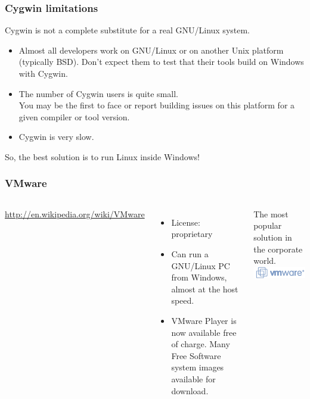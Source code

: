 \begin{frame}
  \frametitle{Cygwin limitations}
  Cygwin is not a complete substitute for a real GNU/Linux system.
  \begin{itemize}
  \item Almost all developers work on GNU/Linux or on another Unix
    platform (typically BSD). Don't expect them to test that their
    tools build on Windows with Cygwin.
  \item The number of Cygwin users is quite small.\\
    You may be the first to face or report building issues on this
    platform for a given compiler or tool version.
  \item Cygwin is very slow.
  \end{itemize}
  So, the best solution is to run Linux inside Windows!
\end{frame}

\begin{frame}
  \frametitle{VMware}
  \begin{columns}[T]
    \url{http://en.wikipedia.org/wiki/VMware}
    \begin{itemize}
    \item License: proprietary
    \item Can run a GNU/Linux PC from Windows, almost at the host speed.
    \item VMware Player is now available free of charge.  Many Free
      Software system images available for download.
    \end{itemize}
    The most popular solution in the corporate world.
    \includegraphics[width=\textwidth]{slides/sysdev-application-development/vmware.png}
  \end{columns}
\end{frame}

